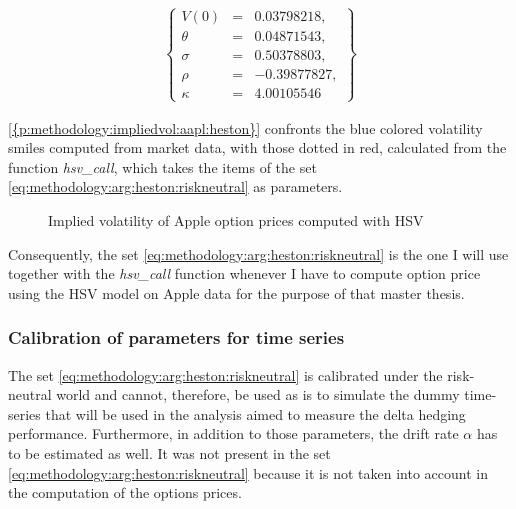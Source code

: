 \documentclass[12pt]{report}
\begin{document}
\begin{align}
  \left \{
  \begin{array}{lcl}
    V(0) &= &0.03798218, \\
    \theta &= &0.04871543, \\
    \sigma &= &0.50378803, \\
    \rho &= &-0.39877827, \\
    \kappa &= &4.00105546 
  \end{array}
  \right \}  
  \label{eq:methodology:arg:heston:riskneutral}
\end{align}

\cref{{p:methodology:impliedvol:aapl:heston}} confronts the blue colored volatility smiles computed from market data, with those dotted in red, calculated from the function \textit{hsv\_call}, which takes the items of the set \ref{eq:methodology:arg:heston:riskneutral} as parameters.

\begin{figure}[H]
  \centering
  
  \caption{Implied volatility of Apple option prices computed with HSV}
  \label{p:methodology:impliedvol:aapl:heston}
\end{figure}


Consequently, the set \ref{eq:methodology:arg:heston:riskneutral} is the one I will use together with the \textit{hsv\_call} function whenever I have to compute option price using the HSV model on Apple data for the purpose of that master thesis.

\subsubsection*{Calibration of parameters for time series}

The set \ref{eq:methodology:arg:heston:riskneutral} is calibrated under the risk-neutral world and cannot, therefore, be used as is to simulate the dummy time-series that will be used in the analysis aimed to measure the delta hedging performance.
Furthermore, in addition to those parameters, the drift rate $\alpha$ has to be estimated as well. It was not present in the set  \ref{eq:methodology:arg:heston:riskneutral} because it is not taken into account in the computation of the options prices.
\end{document}
